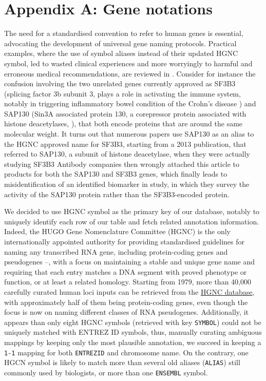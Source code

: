 \section{Appendix A: Gene notations} 
\label{sec:gene-annotation-convention}

The need for a standardised convention to refer to human genes is essential, advocating the development of universal gene naming protocols. Practical examples, where the use of symbol aliases instead of their updated HGNC symbol, led to wasted clinical experiences and more worryingly to harmful and erroneous medical recommendations, are reviewed in \autocite{braschi_etal21}. Consider for instance the confusion involving the two unrelated genes currently approved as SF3B3 (splicing factor 3b subunit 3, plays a role in activating the immune system, notably in triggering inflammatory bowel condition of the Crohn's disease \autocite{gong_etal20}) and SAP130 (Sin3A associated protein 130, a corepressor protein associated with histone deacetylases, \autocite{fleischer_etal03}), that both encode proteins that are around the same molecular weight. It turns out that numerous papers use SAP130 as an alias to the HGNC approved name for SF3B3, starting from a 2013 publication, that referred to SAP130, a subunit of histone deacetylase, when they were actually studying SF3B3 \autocite{suzuki_etal13} Antibody companies then wrongly attached this article to products for both the SAP130 and SF3B3 genes, which finally leads to misidentification of an identified biomarker in \autocite{liu_etal20} study, in which they survey the activity of the SAP130 protein rather than the SF3B3-encoded protein.

We decided to use HGNC symbol as the primary key of our database, notably to uniquely identify each row of our table and fetch related annotation information. Indeed, the HUGO Gene Nomenclature Committee (HGNC) is the only internationally appointed authority for providing standardised guidelines for naming any transcribed RNA gene, including protein-coding genes and pseudogenes \autocite{bruford_etal20}--\autocite{yates_etal17}, with a focus on maintaining a stable and unique gene name and requiring that each entry matches a DNA segment with proved phenotype or function, or at least a related homology. Starting from 1979, more than 40,000 carefully curated human loci inputs can be retrieved from the \href{https://www.genenames.org/}{HGNC database}, with approximately half of them being protein-coding genes, even though the focus is now on naming different classes of RNA pseudogenes.
Additionally, it appears than only eight HGNC symbols (retrieved with key \texttt{SYMBOL}) could not be uniquely matched with ENTREZ ID symbols, thus, manually curating ambiguous mappings by keeping only the most plausible annotation, we succeed in keeping a \texttt{1-1} mapping for both \texttt{ENTREZID} and chromosome name. On the contrary, one HGCN symbol is likely to match more than several old aliases (\texttt{ALIAS}) still commonly used by biologists, or more than one \texttt{ENSEMBL} symbol.

